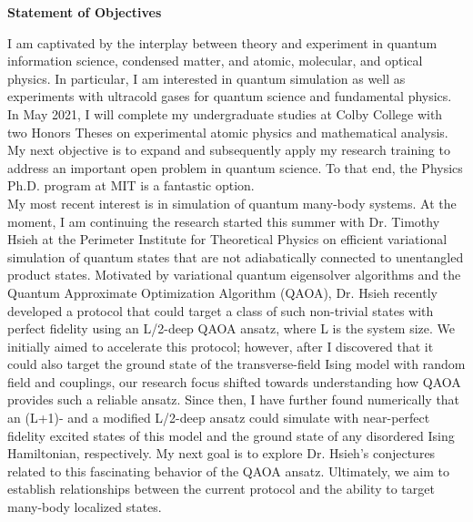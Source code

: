 \documentclass[12pt]{article}
\begin{document}
\begin{center}
	\textbf{Statement of Objectives}
\end{center}
I am captivated by the interplay between theory and experiment in quantum information science, condensed matter, and atomic, molecular, and optical physics. In particular, I am interested in  quantum simulation as well as experiments with ultracold gases for quantum science and fundamental physics. In May 2021, I will complete my undergraduate studies at Colby College with two Honors Theses on experimental atomic physics and mathematical analysis. My next objective is to expand and subsequently apply my research training to address an important open problem in quantum science. To that end, the Physics Ph.D. program at MIT is a fantastic option.  \\ 

My most recent interest is in simulation of quantum many-body systems. At the moment, I am continuing the research started this summer with Dr. Timothy Hsieh at the Perimeter Institute for Theoretical Physics on efficient variational simulation of quantum states that are not adiabatically connected to unentangled product states. Motivated by variational quantum eigensolver algorithms and the Quantum Approximate Optimization Algorithm (QAOA), Dr. Hsieh recently developed a protocol that could target a class of such non-trivial  states with perfect fidelity using an L/2-deep QAOA ansatz, where L is the system size. We initially aimed to accelerate this protocol; however, after I discovered that it could also target the ground state of the transverse-field Ising model with random field and couplings, our research focus shifted towards understanding how QAOA provides such a reliable ansatz. Since then, I have further found numerically that an (L+1)- and a modified L/2-deep ansatz could simulate with near-perfect fidelity excited states of this model and the ground state of any disordered Ising Hamiltonian, respectively. My next goal is to explore Dr. Hsieh's conjectures related to this fascinating behavior of the QAOA ansatz. Ultimately, we aim to establish relationships between the current protocol and the ability to target many-body localized states.\\
\end{document}
